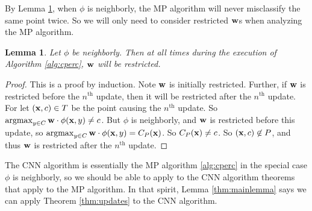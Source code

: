 \documentclass[preprint]{elsarticle}
\newcommand{\argmax}{\operatornamewithlimits{argmax}}
\newcommand{\tth}{ \text{th}}
\newtheorem{lemma}{Lemma}
\begin{document}
By Lemma \ref{thm:restricted}, when $\phi$ is neighborly, the MP algorithm will never misclassify the same point twice. So we will only need to consider restricted ${\bf w}$s when analyzing the MP algorithm. 

\begin{lemma}
\label{thm:restricted}
Let $\phi$ be neighborly. Then at all times during the execution of Algorithm \ref{alg:cperc}, ${\bf w}$ will be restricted.
\end{lemma}
\begin{proof}
This is a proof by induction. Note ${\bf w}$ is initially restricted. 
Further, if ${\bf w}$ is restricted before the $n^\tth$ update, then it will be restricted after the $n^\tth$ update. 
For let $({\bf x},c) \in T$ be the point causing the $n^\tth$ update. So $\argmax_{y \in C} {\bf w} \cdot \phi({\bf x},y) \neq c$. But $\phi$ is neighborly, and ${\bf w}$ is restricted before this update, so $\argmax_{y \in C} {\bf w} \cdot \phi({\bf x},y) = C_P({\bf x})$. So $C_P({\bf x}) \neq c$. So $({\bf x},c) \not \in P$, and thus ${\bf w}$ is restricted after the $n^\tth$ update.
\end{proof}

The CNN algorithm is essentially the MP algorithm \ref{alg:cperc} in the special case $\phi$ is neighborly, so we should be able to apply to the CNN algorithm theorems that apply to the MP algorithm. In that spirit, Lemma \ref{thm:mainlemma} says we can apply Theorem \ref{thm:updates} to the CNN algorithm.
\end{document}
